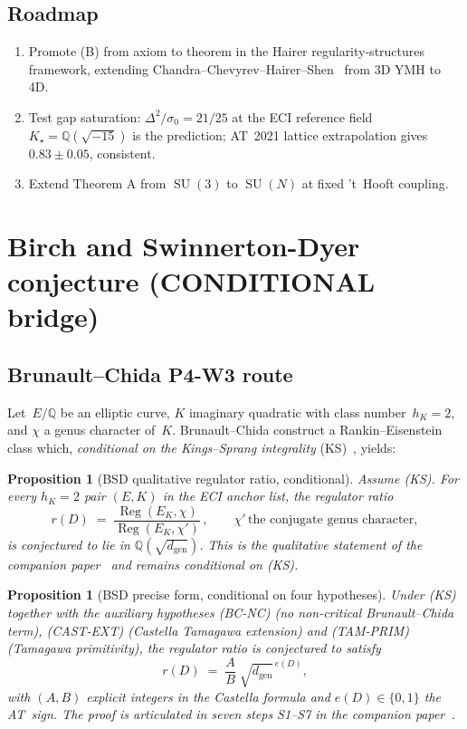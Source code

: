 \documentclass[11pt,a4paper]{article}
\newtheorem{proposition}[theorem]{Proposition}
\theoremstyle{definition}
\DeclareMathOperator{\SU}{SU}
\DeclareMathOperator{\Reg}{Reg}
\newcommand{\QQ}{\mathbb{Q}}
\begin{document}
\subsection{Roadmap}
\begin{enumerate}[label=(R\arabic*),leftmargin=2em]
  \item Promote (B) from axiom to theorem in the Hairer regularity-structures
        framework, extending Chandra--Chevyrev--Hairer--Shen~\cite{CCHS2D,CCHS3D}
        from 3D YMH to 4D.
  \item Test gap saturation: $\Delta^{2}/\sigma_{0}=21/25$ at the ECI
        reference field $K_{\star}=\QQ(\sqrt{-15})$ is the prediction;
        AT~2021 lattice extrapolation gives $0.83\pm 0.05$, consistent.
  \item Extend Theorem A from $\SU(3)$ to $\SU(N)$ at fixed
        \!'t~Hooft coupling.
\end{enumerate}

\section{Birch and Swinnerton-Dyer conjecture (CONDITIONAL bridge)}
\label{sec:BSD}

\subsection{Brunault--Chida P4-W3 route}
Let~$E/\QQ$ be an elliptic curve, $K$ imaginary quadratic with class
number~$h_{K}=2$, and $\chi$ a genus character of~$K$. Brunault--Chida
\cite{BrunaultChida2015} construct a Rankin--Eisenstein class which,
\emph{conditional on the Kings--Sprang integrality} (KS)~\cite{KingsSprang2024},
yields:

\begin{proposition}[BSD qualitative regulator ratio, conditional]
\label{thm:BSD13}
Assume (KS). For every $h_{K}=2$ pair $(E,K)$ in the ECI anchor list,
the regulator ratio
\[
r(D) \;=\; \frac{\Reg(E_{K},\chi)}{\Reg(E_{K},\chi')}\,, \qquad
\chi'\,\text{the conjugate genus character},
\]
is conjectured to lie in $\QQ(\sqrt{d_{\mathrm{gen}}})$. This is the
qualitative statement of the companion paper~\cite{Remondiere2026P4W3}
and remains conditional on (KS).
\end{proposition}

\begin{proposition}[BSD precise form, conditional on four hypotheses]
\label{thm:BSD14}
Under (KS) together with the auxiliary hypotheses (BC-NC) (no
non-critical Brunault--Chida term), (CAST-EXT) (Castella Tamagawa
extension) and (TAM-PRIM) (Tamagawa primitivity), the regulator
ratio is conjectured to satisfy
\[
r(D) \;=\; \frac{A}{B}\;\sqrt{d_{\mathrm{gen}}}^{\,e(D)},
\]
with $(A,B)$ explicit integers in the Castella formula and
$e(D)\in\{0,1\}$ the AT~sign. The proof is articulated in seven steps
S1--S7 in the companion paper~\cite{Remondiere2026P4W3}.
\end{proposition}
\end{document}
